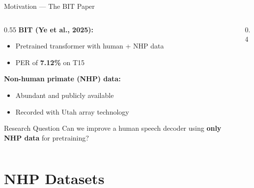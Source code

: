\documentclass[aspectratio=169]{beamer}
\begin{document}
\begin{frame}{Motivation — The BIT Paper}
  \begin{columns}
    \begin{column}{0.55\textwidth}
      \textbf{BIT (Ye et al., 2025):}
      \begin{itemize}
        \item Pretrained transformer with human + NHP data
        \item PER of \textbf{7.12\%} on T15
      \end{itemize}
      \vspace{0.8em}
      \textbf{Non-human primate (NHP) data:}
      \begin{itemize}
        \item Abundant and publicly available
        \item Recorded with Utah array technology
      \end{itemize}
      \vspace{0.8em}
      \begin{alertblock}{Research Question}
        Can we improve a human speech decoder using \textbf{only NHP data} for pretraining?
      \end{alertblock}
    \end{column}
    \begin{column}{0.4\textwidth}
      \begin{center}
      \end{center}
    \end{column}
  \end{columns}
\end{frame}

\section{NHP Datasets}
\end{document}
